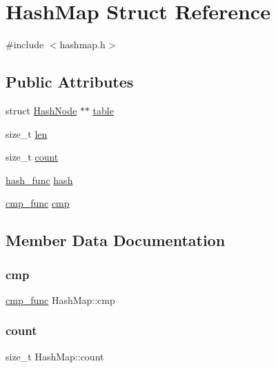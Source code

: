 \hypertarget{structHashMap}{}\section{Hash\+Map Struct Reference}
\label{structHashMap}


{\ttfamily \#include $<$hashmap.\+h$>$}

\subsection*{Public Attributes}
\begin{DoxyCompactItemize}
\item 
struct \hyperlink{structHashNode}{Hash\+Node} $\ast$$\ast$ \hyperlink{structHashMap_a9b6b4ce667e2fba22eeedef8a67bd16e}{table}
\item 
size\+\_\+t \hyperlink{structHashMap_a464e5e54144c37706fe47c69371150a0}{len}
\item 
size\+\_\+t \hyperlink{structHashMap_aba7bba772c9562a8ae3a9b3da4ec94b2}{count}
\item 
\hyperlink{hashmap_8h_a21bba600ec628a973f640c2b9658acef}{hash\+\_\+func} \hyperlink{structHashMap_a0b8167af29685811df0d063df7e9cf8e}{hash}
\item 
\hyperlink{hashmap_8h_a4242c26b9144a31932bc0f2fe8c0d785}{cmp\+\_\+func} \hyperlink{structHashMap_a8d08a18766c7dc01ad4247b1dd4fb094}{cmp}
\end{DoxyCompactItemize}


\subsection{Member Data Documentation}
\hypertarget{structHashMap_a8d08a18766c7dc01ad4247b1dd4fb094}{}\label{structHashMap_a8d08a18766c7dc01ad4247b1dd4fb094} 
\subsubsection{\texorpdfstring{cmp}{cmp}}
{\footnotesize\ttfamily \hyperlink{hashmap_8h_a4242c26b9144a31932bc0f2fe8c0d785}{cmp\+\_\+func} Hash\+Map\+::cmp}

\hypertarget{structHashMap_aba7bba772c9562a8ae3a9b3da4ec94b2}{}\label{structHashMap_aba7bba772c9562a8ae3a9b3da4ec94b2} 
\subsubsection{\texorpdfstring{count}{count}}
{\footnotesize\ttfamily size\+\_\+t Hash\+Map\+::count}

